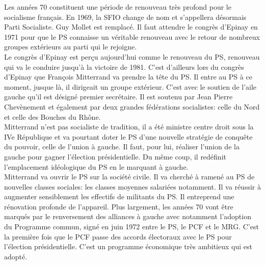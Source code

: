 \documentclass[10pt, a4paper, openany]{book}
\begin{document}
Les années 70 constituent une période de renouveau très profond pour le socialisme français. En 1969, la SFIO change de nom et s'appellera désormais Parti Socialiste. Guy Mollet est remplacé. Il faut attendre le congrès d'Epinay en 1971 pour que le PS connaisse un véritable renouveau avec le retour de nombreux groupes extérieurs au parti qui le rejoigne. \\
Le congrès d'Epinay est perçu aujourd'hui comme le renouveau du PS, renouveau qui va le conduire jusqu'à la victoire de 1981. C'est d'ailleurs lors du congrès d'Epinay que François Mitterrand va prendre la tête du PS. Il entre au PS à ce moment, jusque là, il dirigeait un groupe extérieur. C'est avec le soutien de l'aile gauche qu'il est désigné premier secrétaire. Il est soutenu par Jean Pierre Chevènement et également par deux grandes fédérations socialistes: celle du Nord et celle des Bouches du Rhône. \\
Mitterrand n'est pas socialiste de tradition, il a été ministre centre droit sous la IVe République et va pourtant doter le PS d'une nouvelle stratégie de conquête du pouvoir, celle de l'union à gauche. Il faut, pour lui, réaliser l'union de la gauche pour gagner l'élection présidentielle. Du même coup, il redéfinit l'emplacement idéologique du PS en le marquant à gauche. \\
Mitterrand va ouvrir le PS sur la société civile. Il va cherché à ramené au PS de nouvelles classes sociales: les classes moyennes salariées notamment. Il va réussir à augmenter sensiblement les effectifs de militants du PS. Il entreprend une rénovation profonde de l'appareil. Plus largement, les années 70 vont être marqués par le renversement des alliances à gauche avec notamment l'adoption du Programme commun, signé en juin 1972 entre le PS, le PCF et le MRG. C'est la première fois que le PCF passe des accords électoraux avec le PS pour l'élection présidentielle. C'est un programme économique très ambitieux qui est adopté.
\end{document}

